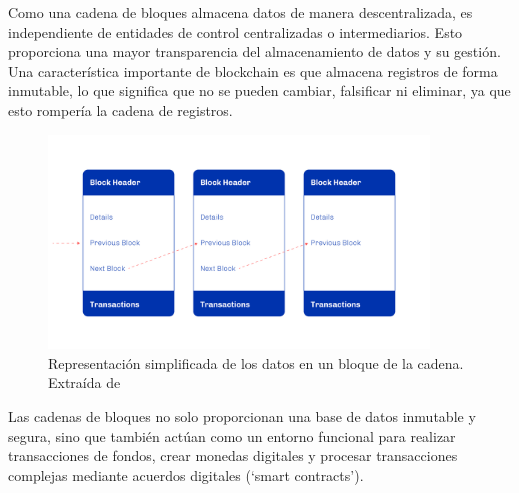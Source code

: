 \documentclass[12pt]{book}
\begin{document}
Como una cadena de bloques almacena datos de manera descentralizada, es independiente de entidades de control centralizadas o intermediarios. Esto proporciona una mayor transparencia del almacenamiento de datos y su gestión. Una característica importante de blockchain es que almacena registros de forma inmutable, lo que significa que no se pueden cambiar, falsificar ni eliminar, ya que esto rompería la cadena de registros.

\begin{figure}
    \centering
    \includegraphics[width=0.9\textwidth]{Bloques.png}
    \caption{Representación simplificada de los datos en un bloque de la cadena. Extraída de~\cite{plutus-smart-contracts}}\label{fig:Bloques}
\end{figure}

Las cadenas de bloques no solo proporcionan una base de datos inmutable y segura, sino que también actúan como un entorno funcional para realizar transacciones de fondos, crear monedas digitales y procesar transacciones complejas mediante acuerdos digitales (`smart contracts').


\end{document}
